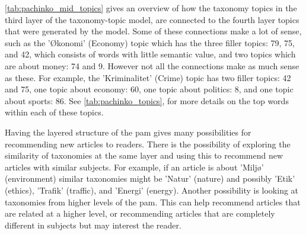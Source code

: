 \autoref{tab:pachinko_mid_topics} gives an overview of how the taxonomy topics in the third layer of the taxonomy-topic model, are connected to the fourth layer topics that were generated by the model.
Some of these connections make a lot of sense, such as the 'Økonomi' (Economy) topic which has the three filler topics: 79, 75, and 42, which consists of words with little semantic value, and two topics which are about money: 74 and 9.
However not all the connections make as much sense as these. 
For example, the 'Kriminalitet' (Crime) topic has two filler topics: 42 and 75, one topic about economy: 60, one topic about politics: 8, and one topic about sports: 86.
See \autoref{tab:pachinko_topics}, for more details on the top words within each of these topics.

Having the layered structure of the \gls{pam} gives many possibilities for recommending new articles to readers.
There is the possibility of exploring the similarity of taxonomies at the same layer and using this to recommend new articles with similar subjects.
For example, if an article is about 'Miljø' (environment) similar taxonomies might be 'Natur' (nature) and possibly 'Etik' (ethics), 'Trafik' (traffic), and 'Energi' (energy).
Another possibility is looking at taxonomies from higher levels of the \gls{pam}.
This can help recommend articles that are related at a higher level, or recommending articles that are completely different in subjects but may interest the reader.

